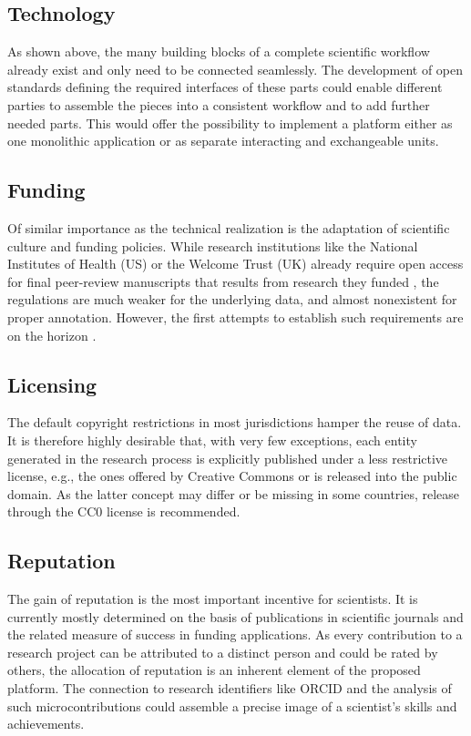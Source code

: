 \documentclass{article}
\begin{document}
\subsection{Technology}

As shown above, the many building blocks of a complete scientific
workflow already exist and only need to be connected seamlessly. The
development of open standards defining the required interfaces of
these parts could enable different parties to assemble the pieces into
a consistent workflow and to add further needed parts. This would
offer the possibility to implement a platform either as one monolithic
application or as separate interacting and exchangeable units.

\subsection{Funding}

Of similar importance as the technical realization is the adaptation
of scientific culture and funding policies. While research
institutions like the National Institutes of Health (US) or the
Welcome Trust (UK) already require open access for final peer-review
manuscripts that results from research they funded \cite{NIH,
  Welcome}, the regulations are much weaker for the underlying data,
and almost nonexistent for proper annotation. However, the first
attempts to establish such requirements are on the horizon
\cite{Welcome2}.

\subsection{Licensing}

The default copyright restrictions in most jurisdictions hamper the
reuse of data. It is therefore highly desirable that, with very few
exceptions, each entity generated in the research process is
explicitly published under a less restrictive license, e.g., the ones
offered by Creative Commons \cite{CC} or is released into the public
domain. As the latter concept may differ or be missing in some
countries, release through the CC0 license \cite{CC0} is recommended.

\subsection{Reputation}

The gain of reputation is the most important incentive for
scientists. It is currently mostly determined on the basis of
publications in scientific journals and the related measure of success
in funding applications. As every contribution to a research project
can be attributed to a distinct person and could be rated by others,
the allocation of reputation is an inherent element of the proposed
platform. The connection to research identifiers like ORCID
\cite{ORCID} and the analysis of such microcontributions could
assemble a precise image of a scientist's skills and achievements.
\end{document}
